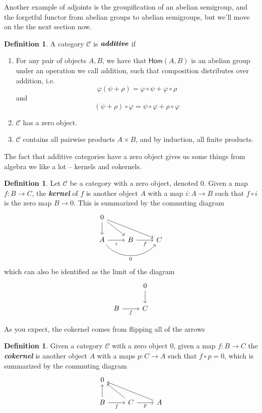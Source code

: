 \documentclass[psamsfonts]{amsart}
\theoremstyle{definition}
\newtheorem{defn}[thm]{Definition}
\theoremstyle{remark}
\renewcommand{\hom}{\mathsf{Hom}}
\newcommand{\ib}[1]{\textbf{\textit{#1}}}
\begin{document}
Another example of adjoints is the groupification of an abelian semigroup, and the forgetful functor from abelian groups to abelian semigroups, but we'll move on the the next section now.
%
\begin{defn}
A category $\mathscr{C}$ is $\ib{additive}$ if
\begin{enumerate}
\item For any pair of objects $A,B$, we have that $\hom(A,B)$ is an abelian group under an operation we call addition, such that composition distributes over addition, i.e.
$$\varphi( \psi + \rho) = \varphi \circ \psi + \varphi \circ \rho $$
and
$$(\psi + \rho) \circ \varphi = \psi \circ \varphi + \rho \circ \varphi $$
\item $\mathscr{C}$ has a zero object.
\item $\mathscr{C}$ contains all pairwise products $A \times B$, and by induction, all finite products.
\end{enumerate}
\end{defn}
%
The fact that additive categories have a zero object gives us some things from algebra we like a lot -- kernels and cokernels.
%
\begin{defn}
Let $\mathscr{C}$ be a category with a zero object, denoted $0$. Given a map $f: B \to C$, the \ib{kernel} of $f$ is another object $A$ with a map $i : A \to B$ such that $f \circ i$ is the zero map $B \to 0$. This is summarized by the commuting diagram
$$\begin{tikzcd}
0 \arrow[d] \arrow[dr] \arrow[drr]\\
A \arrow[rr, "0"' , bend right=50]\arrow[r,"i"'] & B \arrow[r,"f"'] & C
\end{tikzcd}$$
which can also be identified as the limit of the diagram
$$\begin{tikzcd}
& 0 \arrow[d] \\
B \arrow[r,"f"'] & C
\end{tikzcd}$$
\end{defn}
%
As you expect, the cokernel comes from flipping all of the arrows
\begin{defn}
Given a category $\mathscr{C}$ with a zero object $0$, given a map $f: B \to C$ the \ib{cokernel} is another object $A$ with a maps $p : C \to A$ such that $f \circ p = 0$, which is summarized by the commuting  diagram
$$\begin{tikzcd}
0 \\
B \arrow[u] \arrow[r, "f"'] & C \arrow[ul] \arrow[r, "p"'] & A \arrow[ull]
\end{tikzcd}$$
\end{defn}
\end{document}
